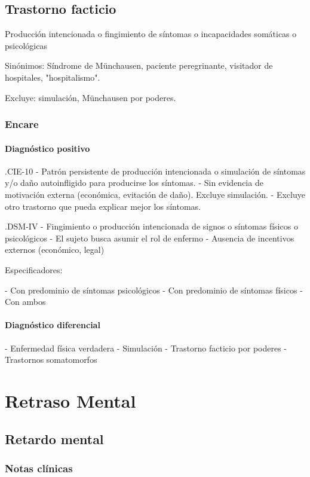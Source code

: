 \documentclass{scrbook}
\begin{document}
\chapter{Trastorno facticio}
Producción intencionada o fingimiento de síntomas o incapacidades somáticas o psicológicas

Sinónimos: Síndrome de Münchausen, paciente peregrinante, visitador de hospitales, "hospitalismo".

Excluye: simulación, Münchausen por poderes.
\section*{Encare}

\subsection*{Diagnóstico positivo}
.CIE-10
- Patrón persistente de producción intencionada o simulación de síntomas y/o daño autoinfligido para producirse los síntomas.
- Sin evidencia de motivación externa (económica, evitación de daño). Excluye simulación.
- Excluye otro trastorno que pueda explicar mejor los síntomas.

.DSM-IV
- Fingimiento o producción intencionada de signos o síntomas físicos o psicológicos
- El sujeto busca asumir el rol de enfermo
- Ausencia de incentivos externos (económico, legal)

Especificadores:

- Con predominio de síntomas psicológicos
- Con predominio de síntomas físicos
- Con ambos

\subsection*{Diagnóstico diferencial}

- Enfermedad física verdadera
- Simulación
- Trastorno facticio por poderes
- Trastornos somatomorfos


\part{Retraso Mental}
\chapter{Retardo mental}
\section*{Notas clínicas}
\end{document}
